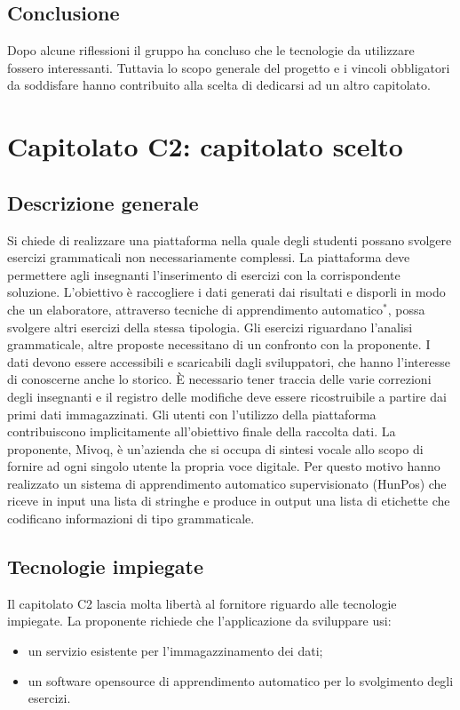 \documentclass[11pt,a4paper]{article}
\begin{document}
	\subsection{Conclusione}
	Dopo alcune riflessioni il gruppo ha concluso che le tecnologie da utilizzare fossero interessanti.
	Tuttavia lo scopo generale del progetto e i vincoli obbligatori da soddisfare hanno contribuito alla
	scelta di dedicarsi ad un altro capitolato.
	\newpage
	\section{Capitolato C2: capitolato scelto}
	\subsection{Descrizione generale}
	Si chiede di realizzare una piattaforma nella quale degli studenti possano svolgere esercizi grammaticali non necessariamente complessi. La piattaforma deve permettere agli insegnanti l'inserimento di esercizi con la corrispondente soluzione. L'obiettivo è raccogliere i dati generati dai risultati e disporli in modo che un elaboratore, attraverso tecniche di apprendimento automatico$^*$, possa svolgere altri esercizi della stessa tipologia. Gli esercizi riguardano l'analisi grammaticale, altre proposte necessitano di un confronto con la proponente. I dati devono essere accessibili e scaricabili dagli sviluppatori, che hanno l'interesse di conoscerne anche lo storico. È necessario tener traccia delle varie correzioni degli insegnanti e il registro delle modifiche deve essere ricostruibile a partire dai primi dati immagazzinati. Gli utenti con l'utilizzo della piattaforma contribuiscono implicitamente all'obiettivo finale della raccolta dati. La proponente, Mivoq, è un'azienda che si occupa di sintesi vocale allo scopo di fornire ad ogni singolo utente la propria voce digitale. Per questo motivo hanno realizzato un sistema di apprendimento automatico supervisionato (HunPos) che riceve in input una lista di stringhe e produce in output una lista di etichette che codificano informazioni di tipo grammaticale.
	\subsection{Tecnologie impiegate}
	Il capitolato C2 lascia molta libertà al fornitore riguardo alle tecnologie impiegate. La proponente richiede che l'applicazione da sviluppare usi:
	\begin{itemize}
		\item un servizio esistente per l'immagazzinamento dei dati;
		\item un software opensource di apprendimento automatico per lo svolgimento degli esercizi.
	\end{itemize}
	
\end{document}
